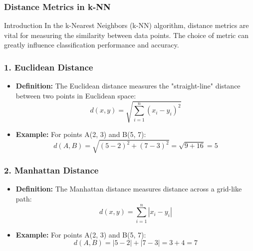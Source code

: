 \documentclass[aspectratio=169]{beamer}
\begin{document}
\begin{frame}[fragile]
    \frametitle{Distance Metrics in k-NN}
    \begin{block}{Introduction}
        In the k-Nearest Neighbors (k-NN) algorithm, distance metrics are vital for measuring the similarity between data points.
        The choice of metric can greatly influence classification performance and accuracy.
    \end{block}
\end{frame}

\begin{frame}[fragile]
    \frametitle{1. Euclidean Distance}
    \begin{itemize}
        \item \textbf{Definition:} The Euclidean distance measures the "straight-line" distance between two points in Euclidean space:
        \begin{equation}
            d(x, y) = \sqrt{\sum_{i=1}^{n} (x_i - y_i)^2}
        \end{equation}
        \item \textbf{Example:} For points A(2, 3) and B(5, 7):
        \begin{equation}
            d(A, B) = \sqrt{(5-2)^2 + (7-3)^2} = \sqrt{9 + 16} = 5
        \end{equation}
    \end{itemize}
\end{frame}

\begin{frame}[fragile]
    \frametitle{2. Manhattan Distance}
    \begin{itemize}
        \item \textbf{Definition:} The Manhattan distance measures distance across a grid-like path:
        \begin{equation}
            d(x, y) = \sum_{i=1}^{n} |x_i - y_i|
        \end{equation}
        \item \textbf{Example:} For points A(2, 3) and B(5, 7):
        \begin{equation}
            d(A, B) = |5 - 2| + |7 - 3| = 3 + 4 = 7
        \end{equation}
    \end{itemize}
\end{frame}
\end{document}
